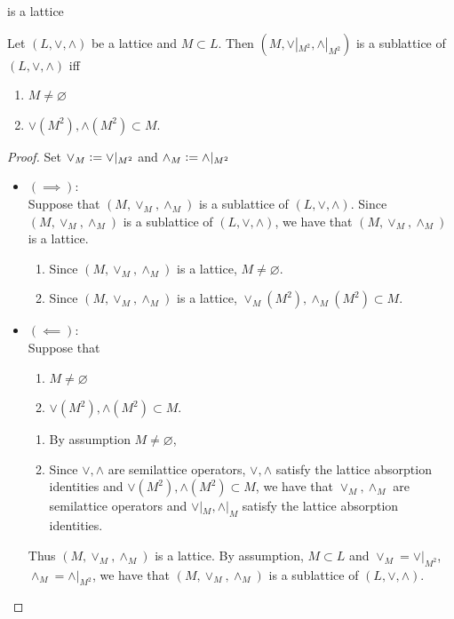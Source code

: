 \documentclass{book}
\begin{document}
	 is a lattice
	
	\begin{ex}
		Let $(L, \vee, \wedge)$ be a lattice and $M \subset L$. Then $(M, \vee|_{M^2}, \wedge|_{M^2})$ is a sublattice of $(L, \vee, \wedge)$ iff
		\begin{enumerate}
			\item $M \neq \varnothing$
			\item $\vee(M^2), \wedge(M^2) \subset M$.
		\end{enumerate}
	\end{ex}
	
	\begin{proof}
		Set $\vee_M \vcentcolon= \vee|_{M^2}$ and $\wedge_M \vcentcolon= \wedge|_{M^2}$ 
		\begin{itemize}
			\item $(\implies)$: \\
			Suppose that $(M, \vee_M, \wedge_M)$ is a sublattice of $(L, \vee, \wedge)$. Since $(M, \vee_M, \wedge_M)$ is a sublattice of $(L, \vee, \wedge)$, we have that $(M, \vee_M, \wedge_M)$ is a lattice.
			\begin{enumerate}
				\item Since $(M, \vee_M, \wedge_M)$ is a lattice, $M \neq \varnothing$.
				\item Since $(M, \vee_M, \wedge_M)$ is a lattice, $\vee_M(M^2), \wedge_M(M^2) \subset M$. 
			\end{enumerate}
			\item $(\impliedby)$: \\ 
			Suppose that 
			\begin{enumerate}
				\item $M \neq \varnothing$
				\item $\vee(M^2), \wedge(M^2) \subset M$.
			\end{enumerate}
			\begin{enumerate}
				\item By assumption $M \neq \varnothing$,
				\item Since $\vee, \wedge$ are semilattice operators, $\vee, \wedge$ satisfy the lattice absorption identities and $\vee(M^2), \wedge(M^2) \subset M$, we have that $\vee_M, \wedge_M$ are semilattice operators and $\vee|_M, \wedge|_M$ satisfy the lattice absorption identities. 
			\end{enumerate}
			Thus $(M, \vee_M, \wedge_M)$ is a lattice. By assumption, $M \subset L$ and $\vee_M = \vee|_{M^2}$, $\wedge_M = \wedge|_{M^2}$, we have that $(M, \vee_M, \wedge_M)$ is a sublattice of $(L, \vee, \wedge)$.
		\end{itemize}
	\end{proof}
	
\end{document}
